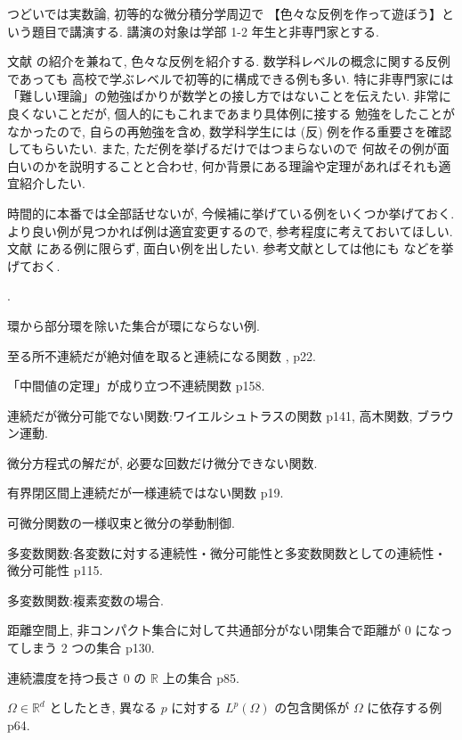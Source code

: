 \documentclass[openany, a4paper, oneside]{book}
\newcounter{enum2}
\renewenvironment{enumerate}{%
\begin{list}%
{%
\arabic{enum2}.\ \,%
}%
{%
\usecounter{enum2}
\setlength{\itemindent}{0pt}%
\setlength{\leftmargin}{6pt}%
\setlength{\rightmargin}{0pt}%
\setlength{\labelsep}{0pt}%
\setlength{\labelwidth}{6pt}%
\setlength{\itemsep}{0pt}%
\setlength{\parsep}{0pt}%
\setlength{\listparindent}{0pt}%
}
}{%
\end{list}%
}
\theoremstyle{break}
\theoremstyle{breakdefn}
\begin{document}
つどいでは実数論, 初等的な微分積分学周辺で
【色々な反例を作って遊ぼう】という題目で講演する.
講演の対象は学部 1-2 年生と非専門家とする.

文献 \cite{GelbaumOlmsted1} の紹介を兼ねて, 色々な反例を紹介する.
数学科レベルの概念に関する反例であっても
高校で学ぶレベルで初等的に構成できる例も多い.
特に非専門家には「難しい理論」の勉強ばかりが数学との接し方ではないことを伝えたい.
非常に良くないことだが, 個人的にもこれまであまり具体例に接する
勉強をしたことがなかったので, 自らの再勉強を含め,
数学科学生には (反) 例を作る重要さを確認してもらいたい.
また, ただ例を挙げるだけではつまらないので
何故その例が面白いのかを説明することと合わせ,
何か背景にある理論や定理があればそれも適宜紹介したい.

時間的に本番では全部話せないが, 今候補に挙げている例をいくつか挙げておく.
より良い例が見つかれば例は適宜変更するので, 参考程度に考えておいてほしい.
文献 \cite{GelbaumOlmsted1} にある例に限らず, 面白い例を出したい.
参考文献としては他にも \cite{HikosaburoKomatsu1, DavidWilliams1, WilliamDumham1} などを挙げておく.

\begin{enumerate}
\item 環から部分環を除いた集合が環にならない例.
\item 至る所不連続だが絶対値を取ると連続になる関数 \cite{GelbaumOlmsted1}, p22.
\item 「中間値の定理」が成り立つ不連続関数 \cite{WilliamDumham1} p158.
\item 連続だが微分可能でない関数:ワイエルシュトラスの関数 \cite{WilliamDumham1} p141, 高木関数, ブラウン運動.
\item 微分方程式の解だが, 必要な回数だけ微分できない関数.
\item 有界閉区間上連続だが一様連続ではない関数 \cite{GelbaumOlmsted1} p19.
\item 可微分関数の一様収束と微分の挙動制御.
\item 多変数関数:各変数に対する連続性・微分可能性と多変数関数としての連続性・微分可能性 \cite{GelbaumOlmsted1} p115.
\item 多変数関数:複素変数の場合.
\item 距離空間上, 非コンパクト集合に対して共通部分がない閉集合で距離が 0 になってしまう 2 つの集合 \cite{GelbaumOlmsted1} p130.
\item 連続濃度を持つ長さ 0 の $\mathbb{R}$ 上の集合 \cite{GelbaumOlmsted1} p85.
\item $\Omega \in \mathbb{R}^d$ としたとき, 異なる $p$ に対する $L^p (\Omega)$ の包含関係が $\Omega$ に依存する例 \cite{DavidWilliams1} p64.
\end{enumerate}
\end{document}
